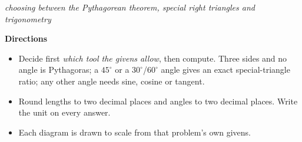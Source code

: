 \documentclass[12pt]{article}
\begin{document}


\begin{center}
{\small\textit{choosing between the Pythagorean theorem, special right triangles and trigonometry}}
\end{center}

\vspace{0.1cm}
\noindent\textbf{Directions}
\begin{itemize}[leftmargin=0.8cm, itemsep=1pt, topsep=2pt]
  \item Decide first \emph{which tool the givens allow}, then compute.
        Three sides and no angle is Pythagoras; a $45^\circ$ or a
        $30^\circ$/$60^\circ$ angle gives an exact special-triangle ratio; any
        other angle needs sine, cosine or tangent.
  \item Round lengths to two decimal places and angles to two decimal places.
        Write the unit on every answer.
  \item Each diagram is drawn to scale from that problem's own givens.
\end{itemize}

\vspace{0.1cm}

\vspace{0.1cm}




\end{document}
